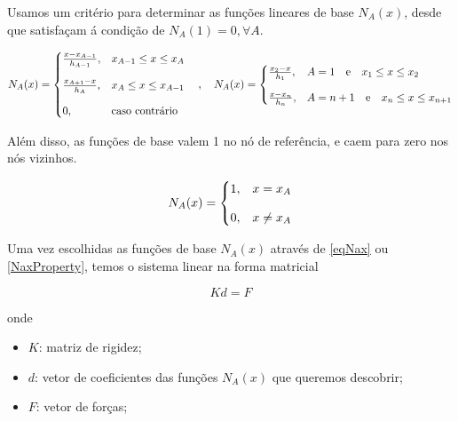 \documentclass[12pt]{scrartcl}
\begin{document}
Usamos um critério para determinar as funções lineares de base $N_A(x)$, desde que satisfaçam á condição de $N_A(1) = 0, \forall A$.

\begin{equation}\label{eqNax}
    N_A(x) =
    \begin{cases}
        \frac{x - x_{A-1}}{h_{A-1}},   & x_{A-1} \leq x \leq x_A            \\
        \noalign{\vskip9pt}
        \frac{x_{A+1} - x}{h_{A}},   & x_{A} \leq x \leq x_{A-1}            \\
        \noalign{\vskip9pt}
        0,   & \textrm{caso contrário}        
    \end{cases}
    \quad , \quad 
    N_A(x) =
    \begin{cases}
        \frac{x_2 - x}{h_1},   & A = 1 \quad \textrm{e} \quad x_{1} \leq x \leq x_2            \\
        \noalign{\vskip9pt}
        \frac{x - x_n}{h_n},   & A = n+1 \quad \textrm{e} \quad x_{n} \leq x \leq x_{n+1}            
    \end{cases}
\end{equation}

Além disso, as funções de base valem 1 no nó de referência, e caem para zero nos nós vizinhos.

\begin{equation}\label{NaxProperty}
    N_A(x) = \begin{cases}
        1,   & x = x_A            \\
        \noalign{\vskip9pt}
        0,   & x \neq x_A            \\          
    \end{cases}
\end{equation}

Uma vez escolhidas as funções de base $N_A(x)$ através de \eqref{eqNax} ou \eqref{NaxProperty}, temos o sistema linear na forma matricial

\begin{equation}\label{eqkdf}
    Kd = F
\end{equation}

onde

\begin{itemize}
    \item $K$: matriz de rigidez;
    \item $d$: vetor de coeficientes das funções $N_A(x)$ que queremos descobrir;
    \item $F$: vetor de forças;
\end{itemize}
\end{document}
